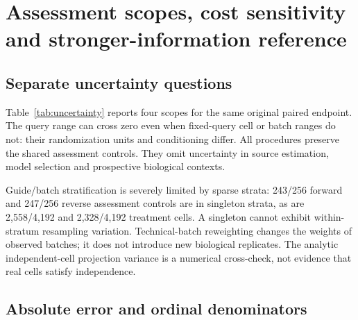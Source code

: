 \section{Assessment scopes, cost sensitivity and stronger-information reference}
\label{app:assessment}
\subsection{Separate uncertainty questions}
Table~\ref{tab:uncertainty} reports four scopes for the same original paired endpoint. The query range can cross zero even when fixed-query cell or batch ranges do not: their randomization units and conditioning differ. All procedures preserve the shared assessment controls. They omit uncertainty in source estimation, model selection and prospective biological contexts.

\begin{table}[htbp]
\centering\small
\caption{Original extension minus worst-query area: central 95\% resampling ranges in units $10^{-5}$. The point estimates remain $4.4212$ forward and $.0789$ reverse. Each row answers its own conditional question; no row supplies biological replication or a joint interval.}
\label{tab:uncertainty}

\end{table}

Guide/batch stratification is severely limited by sparse strata: 243/256 forward and 247/256 reverse assessment controls are in singleton strata, as are 2,558/4,192 and 2,328/4,192 treatment cells. A singleton cannot exhibit within-stratum resampling variation. Technical-batch reweighting changes the weights of observed batches; it does not introduce new biological replicates. The analytic independent-cell projection variance is a numerical cross-check, not evidence that real cells satisfy independence.

\subsection{Absolute error and ordinal denominators}
\begin{table}[htbp]
\centering\small
\caption{Budget-512 diagnostics on original extension purchases. MSE uses units $10^{-3}$. Rank is the fixed-gene Spearman score across query identities; ``Permuted'' uses one fixed scoring-coordinate permutation shared across query rows, without refitting. ``Defined'' is the fraction of 36,130 gene/seed correlations that are defined; undefined terms contribute neutral zero to the fixed-gene aggregate. Zero is a zero-recipient-cost reference even when tabulated beside purchased predictors. All 131 queries and 7,226 aligned genes are retained.}
\label{tab:ranking}

\end{table}

